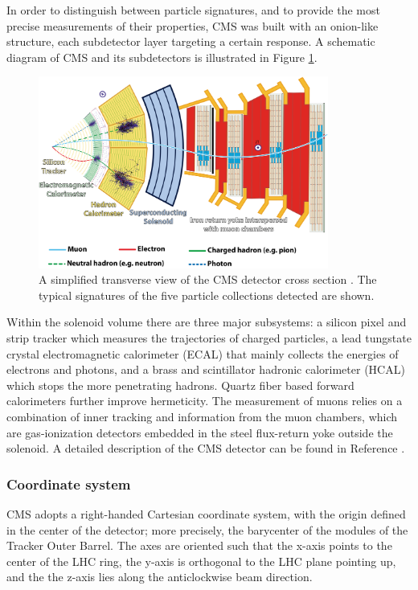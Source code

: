 In order to distinguish between particle signatures, and to provide the most precise measurements of their properties, CMS was built with an onion-like structure, each subdetector layer targeting a certain response.
A schematic diagram of CMS and its subdetectors is illustrated in Figure \ref{fig:CMSslice}.

\begin{figure}[htb]
\begin{center}
\includegraphics[width=0.85\textwidth]{Figures/CMSslice_whiteBackground.png}
\end{center}
\caption{A simplified transverse view of the CMS detector cross section \cite{CMS-PHO-GEN-2016-001}. The typical signatures of the five particle collections detected are shown.}
\label{fig:CMSslice}
\end{figure}

Within the solenoid volume there are three major subsystems:
a silicon pixel and strip tracker which measures the trajectories of charged particles,
a lead tungstate crystal electromagnetic calorimeter (ECAL) that mainly collects the energies of electrons and photons,
and a brass and scintillator hadronic calorimeter (HCAL) which stops the more penetrating hadrons.
Quartz fiber based forward calorimeters further improve hermeticity.
The measurement of muons relies on a combination of inner tracking and information from the muon chambers,
which are gas-ionization detectors embedded in the steel flux-return yoke outside the solenoid.
A detailed description of the CMS detector can be found in Reference \cite{CMS:2008}.

\subsubsection{Coordinate system}
CMS adopts a right-handed Cartesian coordinate system, with the origin defined in the center of the detector; more precisely, the barycenter of the modules of the Tracker Outer Barrel.
The axes are oriented such that the x-axis points to the center of the LHC ring, the y-axis is orthogonal to the LHC plane pointing up, and the the z-axis lies along the anticlockwise beam direction.

